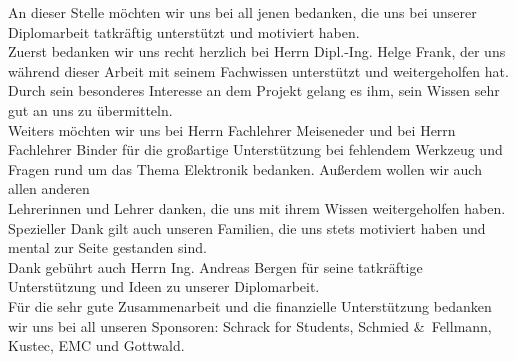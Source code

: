 
\begin{Danksagung}
An dieser Stelle möchten wir uns bei all jenen bedanken, die uns bei unserer Diplomarbeit tatkräftig unterstützt und motiviert haben. \\

Zuerst bedanken wir uns recht herzlich bei Herrn Dipl.-Ing. Helge Frank, der uns während dieser Arbeit mit seinem Fachwissen unterstützt und weitergeholfen hat. 
Durch sein besonderes Interesse an dem Projekt gelang es ihm, sein Wissen sehr gut an uns zu übermitteln. \\

Weiters möchten wir uns bei Herrn Fachlehrer Meiseneder und bei Herrn Fachlehrer Binder für die großartige Unterstützung bei fehlendem Werkzeug und Fragen 
rund um das Thema Elektronik bedanken. Außerdem wollen wir auch allen anderen \\ Lehrerinnen und Lehrer danken, die uns mit ihrem Wissen weitergeholfen haben. \\

Spezieller Dank gilt auch unseren Familien, die uns stets motiviert haben und mental zur Seite gestanden sind. \\

Dank gebührt auch Herrn Ing. Andreas Bergen für seine tatkräftige Unterstützung und Ideen zu unserer Diplomarbeit. \\

Für die sehr gute Zusammenarbeit und die finanzielle Unterstützung bedanken wir uns bei all unseren Sponsoren: Schrack for Students, Schmied \&\ Fellmann, Kustec, EMC und Gottwald.\\
\end{Danksagung}
\newpage

